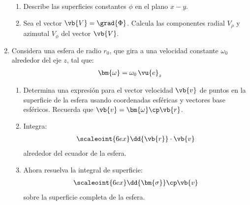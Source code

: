 \begin{enumerate}
\begin{enumerate}[label=\roman*)]
\item Describe las superficies constantes $\phi$ en el plano $x-y$.
\item Sea el vector $\vb{V} = \grad{\Phi}$. Calcula las componentes radial $V_{\rho}$ y azimutal $V_{\phi}$ del vector $\vb{V}$.
\end{enumerate} 
\item Considera una esfera de radio $r_{0}$, que gira a una velocidad constante $\omega_{0}$ alrededor del eje $z$, tal que:
\begin{align*}
\bm{\omega} = \omega_{0} \, \vu{e}_{z}
\end{align*}
\begin{enumerate}[label=\alph*)]
\item Determina una expresión para el vector velocidad $\vb{v}$ de puntos en la superficie de la esfera usando coordenadas esféricas y vectores base esféricos. Recuerda que $\vb{v} = \bm{\omega} \cp \vb{r}$.
\item Integra:
\begin{align*}
\scaleoint{6ex} \dd{\vb{r}} \cdot \vb{v}
\end{align*}
alrededor del ecuador de la esfera.
\item Ahora resuelva la integral de superficie:
\begin{align*}
\scaleoint{6ex} \dd{\bm{\sigma}} \cp \vb{v}
\end{align*}
sobre la superficie completa de la esfera.
\end{enumerate}


\end{enumerate}
